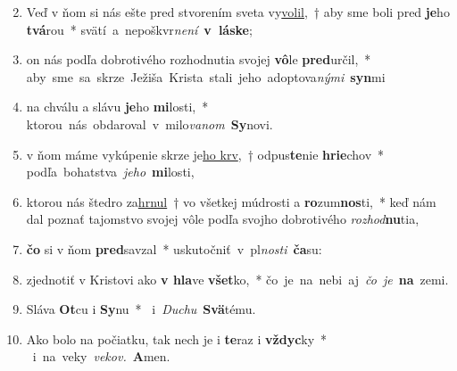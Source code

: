 \begin{flushleft}
\begin{enumerate}[leftmargin=*]
\setcounter{enumi}{1}
\item Veď v ňom si nás ešte pred stvorením sveta vy\underline{volil},~† aby sme boli pred \textbf{je}ho \textbf{tvá}rou~* \mbox{svätí a nepoškvr\textit{není} \textbf{v láske};}
\item on nás podľa dobrotivého rozhodnutia svojej \textbf{vô}le \textbf{pred}určil,~* \mbox{aby sme sa skrze Ježiša Krista stali jeho adoptova\textit{nými} \textbf{syn}mi}
\item na chválu a slávu \textbf{je}ho \textbf{mi}losti,~* \mbox{ktorou nás obdaroval v milo\textit{vanom} \textbf{Sy}novi.}
\item v ňom máme vykúpenie skrze je\underline{ho krv},~† odpus\textbf{te}nie \textbf{hrie}chov~* \mbox{podľa bohatstva \textit{jeho} \textbf{mi}losti,}
\item ktorou nás štedro za\underline{hrnul}~† vo všetkej múdrosti a \textbf{ro}zum\textbf{nos}ti,~* keď nám dal poznať tajomstvo svojej vôle podľa svojho dobrotivého \textit{rozhod}\textbf{nu}tia,
\item \textbf{čo} si v ňom \textbf{pred}savzal~* \mbox{uskutočniť v pl\textit{nosti} \textbf{ča}su:}
\item zjednotiť v Kristovi ako \textbf{v hla}ve \textbf{všet}ko,~* \mbox{čo je na nebi aj \textit{čo je} \textbf{na} zemi.}
\item Sláva \textbf{Ot}cu i \textbf{Sy}nu~* \mbox{ i \textit{Duchu} \textbf{Svä}tému.}
\item Ako bolo na počiatku, tak nech je i \textbf{te}raz i \textbf{vždyc}ky~* \mbox{ i na veky \textit{vekov.} \textbf{A}men.}\end{enumerate}
\end{flushleft}

